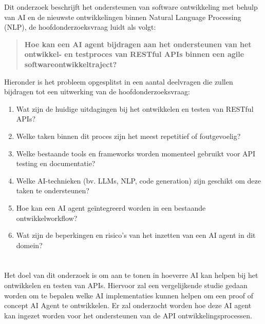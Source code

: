 Dit onderzoek beschrijft het ondersteunen van software ontwikkeling met behulp van AI en de nieuwste ontwikkelingen binnen Natural Language Processing (NLP), de hoofdonderzoeksvraag luidt als volgt:

\begin{quote}
    \textbf{Hoe kan een AI agent bijdragen aan het ondersteunen van het ontwikkel- en testproces van RESTful APIs binnen een agile softwareontwikkeltraject?}
\end{quote}

Hieronder is het probleem opgesplitst in een aantal deelvragen die zullen bijdragen tot een uitwerking van de hoofdonderzoeksvraag:

\begin{enumerate}
    \item Wat zijn de huidige uitdagingen bij het ontwikkelen en testen van RESTful APIs?
    \item Welke taken binnen dit proces zijn het meest repetitief of foutgevoelig?
    \item Welke bestaande tools en frameworks worden momenteel gebruikt voor API testing en documentatie?
    \item Welke AI-technieken (bv. LLMs, NLP, code generation) zijn geschikt om deze taken te ondersteunen?
    \item Hoe kan een AI agent geïntegreerd worden in een bestaande ontwikkelworkflow?
    \item Wat zijn de beperkingen en risico’s van het inzetten van een AI agent in dit domein?
\end{enumerate}


\section{}%
\label{sec:onderzoeksdoelstelling}
Het doel van dit onderzoek is om aan te tonen in hoeverre AI kan helpen bij het ontwikkelen en testen van APIs. Hiervoor zal een vergelijkende studie gedaan worden om te bepalen welke AI implementaties kunnen helpen om een proof of concept AI Agent te ontwikkelen. Er zal onderzocht worden hoe deze AI agent kan ingezet worden voor het ondersteunen van de API ontwikkelingsprocessen. \\

